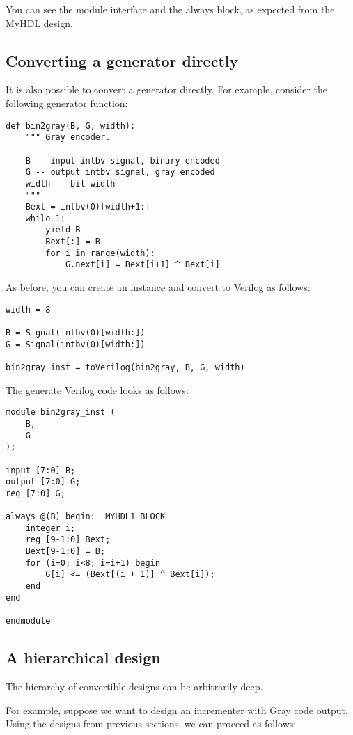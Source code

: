 You can see the module interface and the always block, as expected
from the MyHDL design. 

\subsection{Converting a generator directly\label{conv-usage-gen}}

It is also possible to convert a generator
directly. For example, consider the following generator function:

\begin{verbatim}
def bin2gray(B, G, width):
    """ Gray encoder.

    B -- input intbv signal, binary encoded
    G -- output intbv signal, gray encoded
    width -- bit width
    """
    Bext = intbv(0)[width+1:]
    while 1:
        yield B
        Bext[:] = B
        for i in range(width):
            G.next[i] = Bext[i+1] ^ Bext[i]
\end{verbatim}

As before, you can create an instance and convert to
Verilog as follows:

\begin{verbatim}
width = 8

B = Signal(intbv(0)[width:])
G = Signal(intbv(0)[width:])

bin2gray_inst = toVerilog(bin2gray, B, G, width)
 \end{verbatim}

The generate Verilog code looks as follows:

\begin{verbatim}
module bin2gray_inst (
    B,
    G
);

input [7:0] B;
output [7:0] G;
reg [7:0] G;

always @(B) begin: _MYHDL1_BLOCK
    integer i;
    reg [9-1:0] Bext;
    Bext[9-1:0] = B;
    for (i=0; i<8; i=i+1) begin
        G[i] <= (Bext[(i + 1)] ^ Bext[i]);
    end
end

endmodule
\end{verbatim}

\subsection{A hierarchical design\label{conv-usage-hier}}
The hierarchy of convertible designs can be
arbitrarily deep.

For example, suppose we want to design an
incrementer with Gray code output. Using the
designs from previous sections, we can proceed
as follows:

